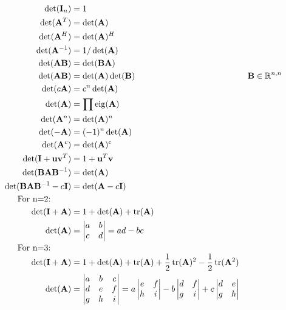 \begin{align}
\det(\mI_n)        &= 1                                   \\
\det(\mA^T)        &= \det(\mA)                           \\
\det(\mA^H)        &= \det(\mA)^H                         \\
\det(\mA^{-1})     &= 1/\det(\mA)                         \\
\det(\mA\mB)       &= \det(\mB\mA)                        \\
\det(\mA\mB)       &= \det(\mA)\det(\mB)                  &\mB\in\sRnn \\
\det(c\mA)         &= c^n\det(\mA)                        \\
\det(\mA)          &= \prod \eig(\mA)                     \\
\det(\mA^n)        &= \det(\mA)^n                         \\
\det(-\mA)         &= (-1)^n\det(\mA)                     \\
\det(\mA^c)        &= \det(\mA)^c                         \\
\det(\mI+\vu \vv^T)&= 1 + \vu^T \vv                       \\
\det(\mB\mA\mB^{-1}) &= \det(\mA)                         \\
\det(\mB\mA\mB^{-1}-c\mI) &= \det(\mA-c\mI)               \\
\noalign{For n=2:}
\det(\mI+\mA)      &= 1 + \det(\mA)+\trace(\mA) \\
\det(\mA) &=\begin{vmatrix} a & b \\ c & d \end{vmatrix} = ad-bc \\
\noalign{For n=3:}
\det(\mI+\mA)      &= 1 + \det(\mA)+\trace(\mA) + \frac{1}{2}\trace(\mA)^2-\frac{1}{2}\trace(\mA^2) \\
\det(\mA) &=\begin{vmatrix} a & b & c \\ d & e & f \\ g & h & i \end{vmatrix} =
 a\begin{vmatrix} e & f \\ h & i \end{vmatrix}
-b\begin{vmatrix} d & f \\ g & i \end{vmatrix}
+c\begin{vmatrix} d & e \\ g & h \end{vmatrix} \\

\end{align}
